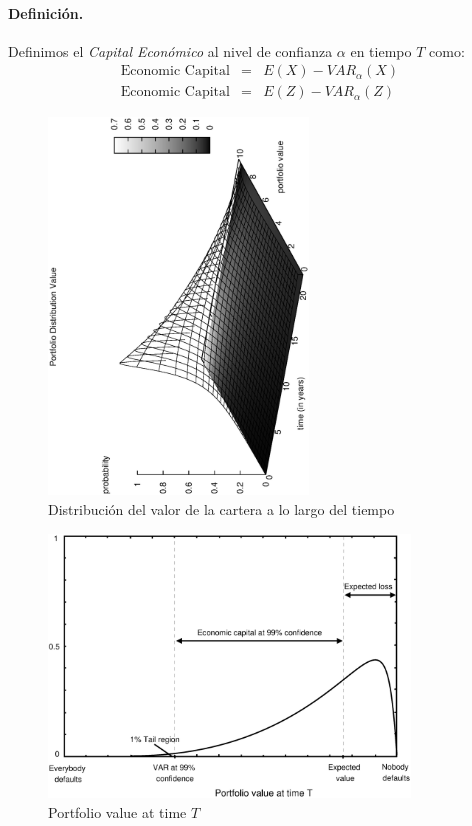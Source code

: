 \paragraph{Definici\'on.} Definimos el \emph{Capital Econ\'omico}
 al nivel de confianza $\alpha$ en tiempo $T$ como:
\begin{eqnarray}
\textrm{Economic Capital} & = & E(X) - VAR_{\alpha}(X) \nonumber \\
\textrm{Economic Capital} & = & E(Z) - VAR_{\alpha}(Z) \nonumber
\end{eqnarray}

\begin{figure}[!hb]
\begin{center}
\includegraphics[height=10cm, angle=-90]{./images/pdistrib.ps}
\caption{Distribuci\'on del valor de la cartera a lo largo del tiempo}
\label{pdistrib}
\end{center}
\end{figure}

\begin{figure}[!hb]
\begin{center}
\includegraphics[height=7cm, angle=0]{./images/creditvar.eps}
\caption{Portfolio value at time $T$}
\label{creditvar}
\end{center}
\end{figure}

